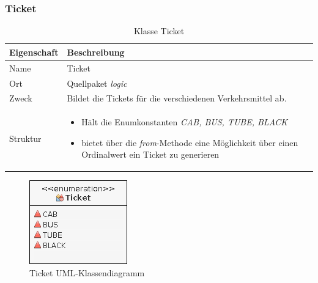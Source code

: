     \subsubsection{Ticket}
        \begin{table}[H]
            \caption{Klasse Ticket}
            \begin{tabular}{p{2.5cm}  p{9.5cm}} 
                \hline
                \textbf{Eigenschaft} & \textbf{Beschreibung}\\
                \hline
                Name & Ticket\\
                Ort & Quellpaket \textit{logic}\\
                \hline
                Zweck &
                Bildet die Tickets für die verschiedenen Verkehrsmittel ab.
                \\
                \hline
                Struktur &
                \begin{itemize}
                    \itemsep0em
                    \item Hält die Enumkonstanten \textit{CAB, BUS, TUBE, BLACK}
                    \item bietet über die \textit{from}-Methode eine Möglichkeit über einen Ordinalwert ein Ticket zu generieren
                \end{itemize}
                \\
                \hline
            \end{tabular}
        \end{table}
        \begin{figure}[H]
            \centering
            \includegraphics[scale=0.7]{img/uml/ticket.png}   
            \caption{Ticket UML-Klassendiagramm}
        \end{figure}


